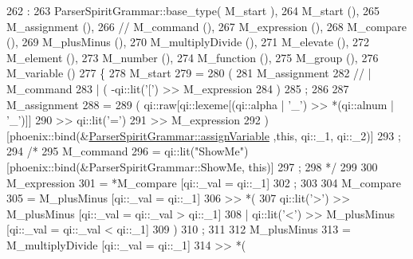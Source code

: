 \begin{DoxyCode}
262                                                                       :
263         ParserSpiritGrammar::base\_type( M\_start ),
264         M\_start                               (),
265         M\_assignment                          (),
266 \textcolor{comment}{//        M\_command                             (),}
267         M\_expression                          (),
268         M\_compare                             (),
269         M\_plusMinus                           (),
270         M\_multiplyDivide                      (),
271         M\_elevate                             (),
272         M\_element                             (),
273         M\_number                              (),
274         M\_function                            (),
275         M\_group                               (),
276         M\_variable                            ()
277 \{
278     M\_start
279     =
280         (
281             M\_assignment
282 \textcolor{comment}{//        |  M\_command}
283         |  ( -qi::lit(\textcolor{charliteral}{'['}) >> M\_expression %
284         )
285         ;
286 
287     M\_assignment
288     =
289         (    qi::raw[qi::lexeme[(qi::alpha | \textcolor{charliteral}{'\_'}) >> *(qi::alnum | \textcolor{charliteral}{'\_'})]]
290         >>   qi::lit(\textcolor{charliteral}{'='})
291         >>   M\_expression
292         )              [phoenix::bind(&\hyperlink{classLifeV_1_1ParserSpiritGrammar_a026a60af01b958c4f06877b40bbd19bf}{ParserSpiritGrammar::assignVariable}
      ,\textcolor{keyword}{this}, qi::\_1, qi::\_2)]
293         ;
294     \textcolor{comment}{/*}
295 \textcolor{comment}{        M\_command}
296 \textcolor{comment}{            =  qi::lit("ShowMe")[phoenix::bind(&ParserSpiritGrammar::ShowMe, this)]}
297 \textcolor{comment}{        ;}
298 \textcolor{comment}{    */}
299 
300     M\_expression
301     =  *M\_compare                                        [qi::\_val = qi::\_1]
302        ;
303 
304     M\_compare
305     =   M\_plusMinus                                      [qi::\_val = qi::\_1]
306         >> *(
307             qi::lit(\textcolor{charliteral}{'>'}) >> M\_plusMinus                  [qi::\_val = qi::\_val > qi::\_1]
308         |   qi::lit(\textcolor{charliteral}{'<'}) >> M\_plusMinus                  [qi::\_val = qi::\_val < qi::\_1]
309         )
310         ;
311 
312     M\_plusMinus
313     =   M\_multiplyDivide                                 [qi::\_val = qi::\_1]
314         >> *(

\end{DoxyCode}
